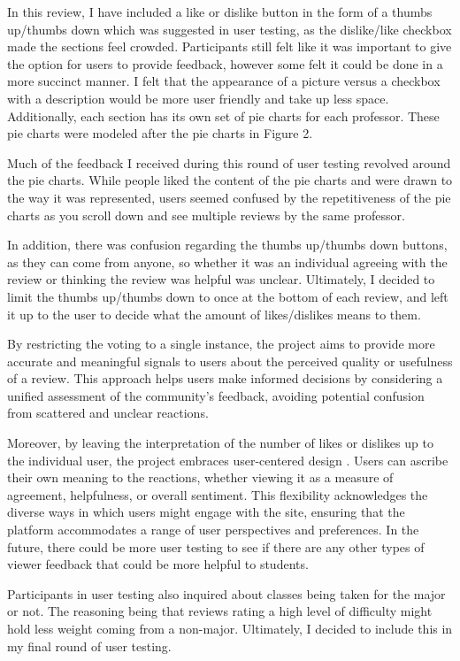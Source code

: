 \documentclass[10pt,twocolumn]{article}
\begin{document}
In this review, I have included a like or dislike button in the form of a thumbs up/thumbs down which was suggested in user testing, as the dislike/like checkbox made the sections feel crowded. Participants still felt like it was important to give the option for users to provide feedback, however some felt it could be done in a more succinct manner. I felt that the appearance of a picture versus a checkbox with a description would be more user friendly and take up less space. Additionally, each section has its own set of pie charts for each professor. These pie charts were modeled after the pie charts in Figure 2.

Much of the feedback I received during this round of user testing revolved around the pie charts. While people liked the content of the pie charts and were drawn to the way it was represented, users seemed confused by the repetitiveness of the pie charts as you scroll down and see multiple reviews by the same professor. 

In addition, there was confusion regarding the thumbs up/thumbs down buttons, as they can come from anyone, so whether it was an individual agreeing with the review or thinking the review was helpful was unclear. Ultimately, I decided to limit the thumbs up/thumbs down to once at the bottom of each review, and left it up to the user to decide what the amount of likes/dislikes means to them.

By restricting the voting to a single instance, the project aims to provide more accurate and meaningful signals to users about the perceived quality or usefulness of a review. This approach helps users make informed decisions by considering a unified assessment of the community's feedback, avoiding potential confusion from scattered and unclear reactions.

Moreover, by leaving the interpretation of the number of likes or dislikes up to the individual user, the project embraces user-centered design \cite{mao2005}. Users can ascribe their own meaning to the reactions, whether viewing it as a measure of agreement, helpfulness, or overall sentiment. This flexibility acknowledges the diverse ways in which users might engage with the site, ensuring that the platform accommodates a range of user perspectives and preferences. In the future, there could be more user testing to see if there are any other types of viewer feedback that could be more helpful to students. 

Participants in user testing also inquired about classes being taken for the major or not. The reasoning being that reviews rating a high level of difficulty might hold less weight coming from a non-major. Ultimately, I decided to include this in my final round of user testing. 
\end{document}
